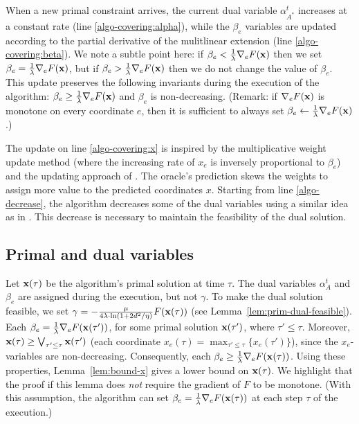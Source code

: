 When a new primal constraint arrives, the current dual variable $\alpha^{t}_{A^*}$ increases at a constant rate (line \ref{algo-covering:alpha}), while the $\beta_e$ variables are updated according to the partial derivative of the mulitlinear extension (line \ref{algo-covering:beta}). We note a subtle point here: if $\beta_e < \frac{1}{\lambda} \nabla_{e} F(\mathbf{x})$ then we set
$\beta_e = \frac{1}{\lambda} \nabla_{e} F(\mathbf{x})$, but if $\beta_e > \frac{1}{\lambda} \nabla_{e} F(\mathbf{x})$ then we do not change the value of $\beta_e$. This update preserves the following invariants during the execution of the algorithm: $\beta_{e} \geq \frac{1}{\lambda} \nabla_{e} F(\mathbf{x})$ and $\beta_{e}$ is non-decreasing. (Remark: if $\nabla_{e} F(\mathbf{x})$ is monotone on every coordinate $e$, then it is sufficient to always set $\beta_{e} \gets \frac{1}{\lambda} \nabla_{e} F(\mathbf{x})$.)

The update on line \ref{algo-covering:x} is inspired by the multiplicative weight update method (where the increasing rate of $x_{e}$
is inversely proportional to $\beta_{e}$) and the updating approach of \cite{BamasMaggiori20:The-Primal-Dual-method}. The oracle's prediction skews the weights to assign more value to the predicted coordinates $x$.
Starting from line \ref{algo-decrease}, the algorithm decreases some of the dual variables using a similar idea as in
\cite{AzarBuchbinder16:Online-Algorithms}. This decrease is necessary to maintain the feasibility of the dual solution.

\subsection{Primal and dual variables}
Let $\mathbf{x}(\tau)$ be the algorithm's primal solution at time $\tau$. The dual variables $\alpha^{t}_{A}$ and $\beta_{e}$ are assigned during the execution, but not $\gamma$. To make the dual solution feasible, we set $\gamma = -\frac{\mu}{4\lambda \cdot \ln(1+2d^{2}/\eta)} F(\mathbf{x}(\tau))$ (see Lemma~\ref{lem:prim-dual-feasible}). Each $\beta_{e} = \frac{1}{\lambda} \nabla_{e} F(\mathbf{x}(\tau'))$, for some primal solution $\mathbf{x}(\tau')$, where $\tau' \le \tau$. Moreover, $\mathbf{x}(\tau) \geq \bigvee_{\tau' \le \tau} \mathbf{x}(\tau')$ (each coordinate $x_{e}(\tau) = \max_{\tau' \le \tau}\{x_{e}(\tau')\}$), since the $x_e$-variables are non-decreasing. Consequently, each $\beta_{e} \geq \frac{1}{\lambda} \nabla_{e} F(\mathbf{x}(\tau))$. Using these properties, Lemma~\ref{lem:bound-x} gives a lower bound on $\mathbf{x}(\tau)$. We highlight that the proof if this lemma does \emph{not} require the gradient of $F$ to be monotone.
(With this assumption, the algorithm can set $\beta_{e} = \frac{1}{\lambda} \nabla_{e} F(\mathbf{x}(\tau))$ at each step $\tau$ of the execution.)


